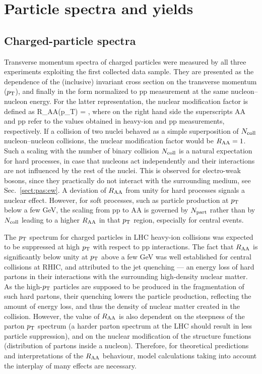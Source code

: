 \section{Particle spectra and yields}
\label{secks:spectra}
\subsection{Charged-particle spectra}
\label{subsecks:transspectra}
Transverse momentum spectra of charged particles were measured by all three experiments exploiting the first collected data sample. They are presented as the dependence of the (inclusive) invariant cross section on the transverse momentum ($p_{\rm T}$), and finally in the form normalized to pp measurement at the same nucleon--nucleon energy. For the latter representation, the nuclear modification factor is defined as
\be
R_{\rm AA}(p_{\rm T}) =  ,
\label{eqks:RAA}
\ee
where on the right hand side the superscripts AA and pp refer to the values obtained in heavy-ion and pp measurements, respectively. If a collision of two nuclei behaved as a simple superposition of $N_{\rm coll}$ nucleon--nucleon collisions, the nuclear modification factor would be $R_{\rm AA} = 1$. Such a scaling with the number of binary collision $N_{\rm coll}$ is a natural expectation for hard processes, in case that nucleons act independently and their interactions are not influenced by the rest of the nuclei. This is observed for electro-weak bosons, since they practically do not interact with the surrounding medium, see Sec.~\ref{sect:pas:ew}. A deviation of $R_{\rm AA}$ from unity for hard processes signals a nuclear effect. However, for soft processes, such as particle production at $p_{\rm T}$ below a few GeV, the scaling from pp to AA is governed by $N_{\rm part}$ rather than by $N_{\rm coll}$ leading to a higher $R_{\rm AA}$ in that $p_{\rm T}$ region, especially for central events.

The $p_{\rm T}$ spectrum for charged particles in LHC heavy-ion collisions was expected to be suppressed at high $p_{\rm T}$ with respect to pp interactions. The fact that $R_{\rm AA}$ is significantly below unity at $p_{\rm T}$ above a few GeV was well established for central collisions at RHIC, and attributed to the jet quenching --- an energy loss of hard partons in their interactions with the surrounding high-density nuclear matter. As the high-$p_{\rm T}$ particles are supposed to be produced in the fragmentation of such hard partons, their quenching lowers the particle production, reflecting the amount of energy loss, and thus the density of nuclear matter created in the collision. However, the value of $R_{\rm AA}$ is also dependent on the steepness of the parton $p_{\rm T}$ spectrum (a harder parton spectrum at the LHC should result in less particle suppression), and on the nuclear modification of the structure functions (distribution of partons inside a nucleon). Therefore, for theoretical predictions and interpretations of the $R_{\rm AA}$ behaviour, model calculations taking into account the interplay of many effects are necessary.


